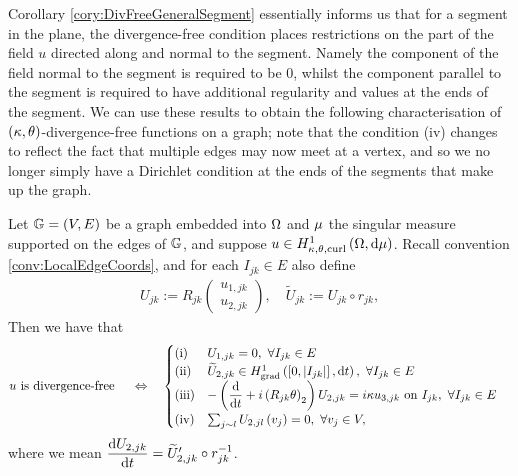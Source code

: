 Corollary \ref{cory:DivFreeGeneralSegment} essentially informs us that for a segment in the plane, the divergence-free condition places restrictions on the part of the field $u$ directed along and normal to the segment.
Namely the component of the field normal to the segment is required to be $0$, whilst the component parallel to the segment is required to have additional regularity and values at the ends of the segment.
We can use these results to obtain the following characterisation of $\left( \kappa, \theta \right)$-divergence-free functions on a graph; note that the condition (iv) changes to reflect the fact that multiple edges may now meet at a vertex, and so we no longer simply have a Dirichlet condition at the ends of the segments that make up the graph.
\begin{theorem} \label{thm:DivFreeWholeGraph}
	Let $\mathbb{G}=\left( V,E \right)$ be a graph embedded into $\Omega$ and $\mu$ the singular measure supported on the edges of $\mathbb{G}$, and suppose $u\in H^1_{\kappa,\theta,\mathrm{curl}}\left( \Omega, \mathrm{d}\mu \right)$.
	Recall convention \ref{conv:LocalEdgeCoords}, and for each $I_{jk}\in E$ also define
	\begin{align*}
		U_{jk} := R_{jk}\begin{pmatrix} u_{1,jk} \\ u_{2,jk} \end{pmatrix}, \quad
		\widetilde{U}_{jk} := U_{jk} \circ r_{jk},
	\end{align*}
	Then we have that
	\begin{align*}
		u \text{ is divergence-free } &\quad\Leftrightarrow\quad
		\begin{cases}
		\mathrm{(i)} & U_{1,jk} = 0, \ \forall I_{jk}\in E\\
		\mathrm{(ii)} & \widetilde{U}_{2,jk} \in \gradSob{\interval{I_{jk}}}{t}, \ \forall I_{jk}\in E \\
		\mathrm{(iii)} & -\bracs{\diff{}{t} + i\bracs{R_{jk}\qm}_2}U_{2,jk} = i\wavenumber u_{3,jk} \text{ on } I_{jk}, \ \forall I_{jk}\in E\\
		\mathrm{(iv)} & \sum_{j\con l}U_{2,jl}\bracs{v_j} = 0, \ \forall v_j\in V,
		\end{cases}
	\end{align*}
	where we mean $\dfrac{\mathrm{d}U_{2,jk}}{\mathrm{d}t} = \widetilde{U}_{2,jk}' \circ r_{jk}^{-1}$.
\end{theorem}
